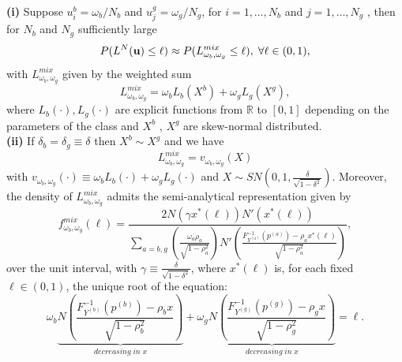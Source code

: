 \documentclass[10pt,a4paper]{amsart}
\begin{document}
\begin{Proposition}\label{Limit-distrib}
 {\bf{(i)}} Suppose $u^b_i = \omega_b/N_b$  and $u^g_j = \omega_g/N_g$, for $i=1,\ldots,N_b$ and $j=1,\ldots,N_g$ , then for $N_b$ and $N_g $ sufficiently large
$$
P(L^N({\bf{u}})\leq \ell) \approx P(L^{mix}_{\omega_b,\omega_g}\leq \ell),\; \forall \ell\in (0,1),
$$
with $L^{mix}_{\omega_b,\omega_g}$ given by the weighted sum
\begin{equation} \label{asymp1}
L^{mix}_{\omega_b,\omega_g}=\omega_bL_b(X^b)+\omega_gL_g(X^g),
\end{equation}
where $L_b(\cdot),L_g(\cdot)$ are explicit functions from $\mathbb{R}$ to $[0,1]$ depending on the parameters of the class and $X^b$ , $X^g$ are skew-normal distributed.\\
 {\bf{(ii)}} If $\delta_b=\delta_g\equiv \delta$ then $X^b\sim X^g$ and we have 
\begin{equation} \label{asymp2}
 L^{mix}_{\omega_b,\omega_g}=v_{\omega_b,\omega_g}(X)
\end{equation}
 with $v_{\omega_b,\omega_g}(\cdot)\equiv \omega_bL_b(\cdot)+\omega_gL_g(\cdot)$ and $X\sim SN(0,1,\frac{\delta}{\sqrt{1-\delta^2}})$. Moreover, the  density of $ L^{mix}_{\omega_b,\omega_g}$ admits the semi-analytical representation given by
\begin{equation}\label{dens}
f^{mix}_{\omega_b,\omega_g}(\ell) =\frac{2 N(\gamma x^*(\ell)) N'(x^*(\ell))}{ \sum_{a = b,g}\left(\frac{\omega_a\rho_a}{\sqrt{1-\rho_a^2}}\right)N'\left(\frac{F_{Y^{(a)}}^{-1}(p^{(a)})-\rho_a x^*(\ell)}{\sqrt{1-\rho_a^2}} \right) },
\end{equation}
over the unit interval, with $\gamma \equiv \frac{\delta}{\sqrt{1-\delta^2}}$, where $x^*(\ell)$ is, for each fixed $\ell \in (0,1)$, the unique root of the equation:
$$
\omega_b\!\underbrace{N\left(\frac{F_{Y^{(b)}}^{-1}(p^{(b)}) - \rho_b x} {\sqrt{1-\rho_b^2}}\right)}_{decreasing \;in\; x}\!\!+\omega_g\!\underbrace{N\left(\frac{F_{Y^{(g)}}^{-1}(p^{(g)}) - \rho_g x} {\sqrt{1-\rho_g^2}}\right)}_{decreasing \;in\; x}\!=\ell.
$$
\end{Proposition}
\end{document}
